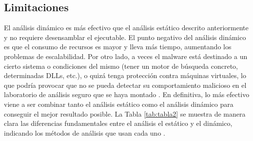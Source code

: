 \subsection{Limitaciones}

\noindent El análisis dinámico es más efectivo que el análisis estático descrito anteriormente y no requiere desensamblar el ejecutable. El punto negativo del análisis dinámico es que el consumo de recursos es mayor y lleva más tiempo, aumentando los problemas de escalabilidad. Por otro lado, a veces el malware está destinado a un cierto sistema o condiciones del mismo (tener un motor de búsqueda concreto, determinadas \gls{DLL}s, etc.), o quizá tenga protección contra máquinas virtuales, lo que podría provocar que no se pueda detectar su comportamiento malicioso en el laboratorio de análisis seguro que se haya montado \cite{Gandotra2014}. En definitiva, lo más efectivo viene a ser combinar tanto el análisis estático como el análisis dinámico para conseguir el mejor resultado posible. La Tabla \ref{tab:tabla2} se muestra de manera clara las diferencias fundamentales entre el análisis el estático y el dinámico, indicando los métodos de análisis que usan cada uno \cite{121}. 


